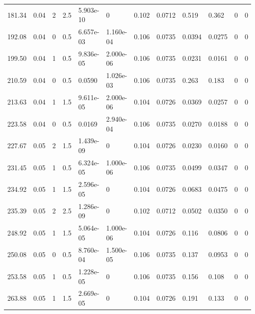 \documentclass[preview]{standalone}
\begin{document}
{{\begin{tabular}{L{1.2cm}C{1.2cm} C{0.3cm}C{0.5cm} C{1.4cm}C{1.4cm} C{1.4cm}C{1.4cm} C{1.6cm}C{1.6cm} C{1.6cm}C{1.6cm}}
  181.34  &  0.04  & 2     & 2.5 &  5.903e-10  & 0  &  0.102&   0.0712& 0.519 & 0.362   &  0 & 0  \\ 
  192.08  &  0.04  & 0     & 0.5 &  6.657e-03  & 1.160e-04  &  0.106&   0.0735& 0.0394 & 0.0275   &  0 & 0  \\ 
  199.50  &  0.04  & 1     & 0.5 &  9.836e-05  & 2.000e-06  &  0.106&   0.0735& 0.0231 & 0.0161   &  0 & 0  \\ 
  210.59  &  0.04  & 0     & 0.5 &  0.0590  & 1.026e-03  &  0.106&   0.0735& 0.263 & 0.183   &  0 & 0  \\ 
  213.63  &  0.04  & 1     & 1.5 &  9.611e-05  & 2.000e-06  &  0.104&   0.0726& 0.0369 & 0.0257   &  0 & 0  \\ 
  223.58  &  0.04  & 0     & 0.5 &  0.0169  & 2.940e-04  &  0.106&   0.0735& 0.0270 & 0.0188   &  0 & 0  \\ 
  227.67  &  0.05  & 2     & 1.5 &  1.439e-09  & 0  &  0.104&   0.0726& 0.0230 & 0.0160   &  0 & 0  \\ 
  231.45  &  0.05  & 1     & 0.5 &  6.324e-05  & 1.000e-06  &  0.106&   0.0735& 0.0499 & 0.0347   &  0 & 0  \\ 
  234.92  &  0.05  & 1     & 1.5 &  2.596e-05  & 0  &  0.104&   0.0726& 0.0683 & 0.0475   &  0 & 0  \\ 
  235.39  &  0.05  & 2     & 2.5 &  1.286e-09  & 0  &  0.102&   0.0712& 0.0502 & 0.0350   &  0 & 0  \\ 
  248.92  &  0.05  & 1     & 1.5 &  5.064e-05  & 1.000e-06  &  0.104&   0.0726& 0.116 & 0.0806   &  0 & 0  \\ 
  250.08  &  0.05  & 0     & 0.5 &  8.760e-04  & 1.500e-05  &  0.106&   0.0735& 0.137 & 0.0953   &  0 & 0  \\ 
  253.58  &  0.05  & 1     & 0.5 &  1.228e-05  & 0  &  0.106&   0.0735& 0.156 & 0.108   &  0 & 0  \\ 
  263.88  &  0.05  & 1     & 1.5 &  2.669e-05  & 0  &  0.104&   0.0726& 0.191 & 0.133   &  0 & 0  \\ 
\hline 
\end{tabular} 

}}
\end{document}
